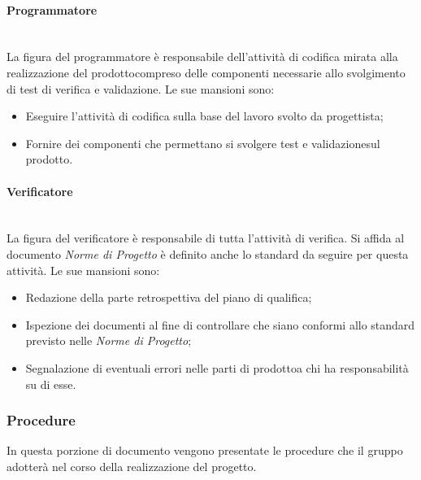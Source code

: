 			\paragraph{Programmatore}\mbox{}\\ [1mm]
				La figura del programmatore è responsabile dell'attività di codifica mirata alla realizzazione del prodotto\glosp compreso delle componenti necessarie allo svolgimento di test di verifica e validazione.
				Le sue mansioni sono:
				\begin{itemize}
					\item Eseguire l'attività di codifica sulla base del lavoro svolto da progettista;
					\item Fornire dei componenti che permettano si svolgere test e validazione\glosp sul prodotto\glo.
				\end{itemize}
			\paragraph{Verificatore}\mbox{}\\ [1mm]
				La figura del verificatore è responsabile di tutta l'attività di verifica.
				Si affida al documento \textit{Norme di Progetto} è definito anche lo standard da seguire per questa attività.
				Le sue mansioni sono:
				\begin{itemize}
					\item Redazione della parte retrospettiva del piano di qualifica;
					\item Ispezione dei documenti al fine di controllare che siano conformi allo standard previsto nelle \textit{Norme di Progetto};
					\item Segnalazione di eventuali errori nelle parti di prodotto\glosp a chi ha responsabilità su di esse.
				\end{itemize}
		\subsubsection{Procedure}
			In questa porzione di documento vengono presentate le procedure che il gruppo adotterà nel corso della realizzazione del progetto.
